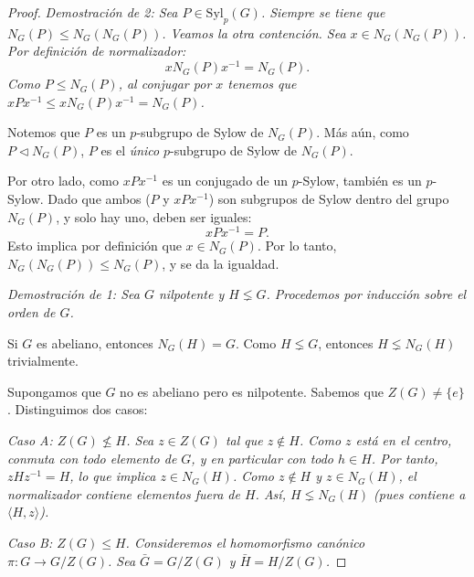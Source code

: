 \begin{proof}
    \itshape Demostración de 2: \normalfont
    Sea $P \in \text{Syl}_p(G)$. Siempre se tiene que $N_G(P) \le N_G(N_G(P))$. Veamos la otra contención.
    Sea $x \in N_G(N_G(P))$. Por definición de normalizador:
    \begin{equation*}
        x N_G(P) x^{-1} = N_G(P).
    \end{equation*}
    Como $P \le N_G(P)$, al conjugar por $x$ tenemos que $xPx^{-1} \le x N_G(P) x^{-1} = N_G(P)$.
    
    Notemos que $P$ es un $p$-subgrupo de Sylow de $N_G(P)$. Más aún, como $P \triangleleft N_G(P)$, $P$ es el \emph{único} $p$-subgrupo de Sylow de $N_G(P)$.
    
    Por otro lado, como $xPx^{-1}$ es un conjugado de un $p$-Sylow, también es un $p$-Sylow.
    Dado que ambos ($P$ y $xPx^{-1}$) son subgrupos de Sylow dentro del grupo $N_G(P)$, y solo hay uno, deben ser iguales:
    \begin{equation*}
        xPx^{-1} = P.
    \end{equation*}
    Esto implica por definición que $x \in N_G(P)$.
    Por lo tanto, $N_G(N_G(P)) \le N_G(P)$, y se da la igualdad.
    
    \itshape Demostración de 1: \normalfont
    Sea $G$ nilpotente y $H \lneq G$. Procedemos por inducción sobre el orden de $G$.
    
    Si $G$ es abeliano, entonces $N_G(H) = G$. Como $H \lneq G$, entonces $H \lneq N_G(H)$ trivialmente.
    
    Supongamos que $G$ no es abeliano pero es nilpotente. Sabemos que $Z(G) \neq \{e\}$.
    Distinguimos dos casos:
    
    \itshape Caso A: $Z(G) \not\le H$. \normalfont
    Sea $z \in Z(G)$ tal que $z \notin H$.
    Como $z$ está en el centro, conmuta con todo elemento de $G$, y en particular con todo $h \in H$.
    Por tanto, $zHz^{-1} = H$, lo que implica $z \in N_G(H)$.
    Como $z \notin H$ y $z \in N_G(H)$, el normalizador contiene elementos fuera de $H$.
    Así, $H \lneq N_G(H)$ (pues contiene a $\langle H, z \rangle$).
    
    \itshape Caso B: $Z(G) \le H$. \normalfont
    Consideremos el homomorfismo canónico $\pi: G \to G/Z(G)$.
    Sea $\bar{G} = G/Z(G)$ y $\bar{H} = H/Z(G)$.
    

\end{proof}
